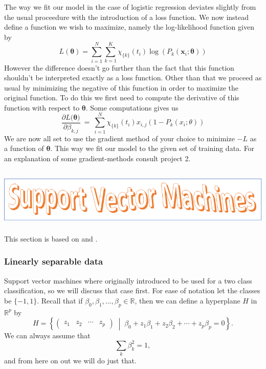 \documentclass[parskip=half]{scrartcl}
\newcommand{\setof}[2]{\left\{ #1 \; \middle\vert \; #2 \right\}}
\theoremstyle{definition}
\theoremstyle{remark}
\newcommand{\R}{\mathbb{R}}
\begin{document}
The way we fit our model in the case of logistic regression deviates
slightly from the usual proceedure with the introduction of a 
loss function. We now instead define a function we wish to
maximize, namely the log-likelihood function given by 
\begin{equation}
    L(\bm{\theta}) = \sum_{i=1}^N \sum_{k=1}^K 
    \chi_{\{k\}}(t_i) \log( P_k(\bm{x}_i; \bm{\theta}))
\end{equation}
However the difference doesn't go further than the fact that this function
shouldn't be interpreted exactly as a loss function. 
Other than that we proceed as usual by minimizing the negative of this 
function in order to maximize the original function. To do this we
first need to compute the derivative of this function with respect 
to $\bm{\theta}$. Some computations gives us
\begin{equation}
    \frac{\partial L (\bm{\theta)}}{\partial \beta_{k,j}} \ = \
    \sum_{i=1}^N \chi_{\{k\}}(t_i) x_{i,j} (1 - P_k(x_i ; \theta))
\end{equation}
We are now all set to use the gradient method of your choice to minimize
$-L$ as a function of $\bm{\theta}$. This way we fit our model to the given
set of training data. For an explanation of some gradient-methods consult
project 2.

\subsection{\protect\includegraphics{svmheading.png}}

This section is based on \cite[Chapter 9]{jwht:intro} and \cite[Chapter 12]{htf:esl}.

\subsubsection{Linearly separable data}

Support vector machines where originally introduced to be used for a two class classification, so we will discuss that case first. 
For ease of notation let the classes be $\{-1,1\}$.
Recall that if $\beta_0, \beta_1, \ldots, \beta_p \in \R$, then we can define a hyperplane $H$ in $\R^p$ by 
\[
	H = \setof{\begin{pmatrix} z_1 & z_2  & \cdots & z_p \end{pmatrix}}{\beta_0 + z_1 \beta_1 + z_2 \beta_2 + \cdots + z_p \beta_p = 0}. 
\]  
We can always assume that  
\[
	\sum_k \beta_k^2 = 1,
\]
and from here on out we will do just that. 
\end{document}
